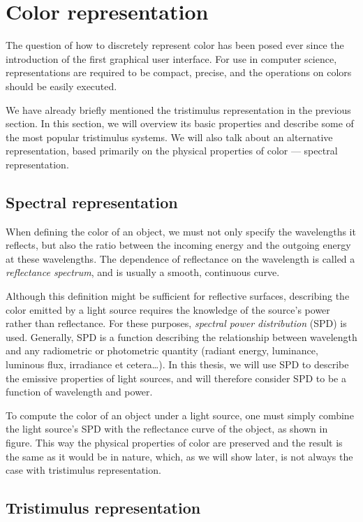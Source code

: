 \section{Color representation}

The question of how to discretely represent color has been posed ever since the introduction of the first graphical user interface. For use in computer science, representations are required to be compact, precise, and the operations on colors should be easily executed.

We have already briefly mentioned the tristimulus representation in the previous section. In this section, we will overview its basic properties and describe some of the most popular tristimulus systems. We will also talk about an alternative representation, based primarily on the physical properties of color --- spectral representation.

\subsection{Spectral representation}

When defining the color of an object, we must not only specify the wavelengths it reflects, but also the ratio between the incoming energy and the outgoing energy at these wavelengths. The dependence of reflectance on the wavelength is called a \emph{reflectance spectrum}, and is usually a smooth, continuous curve.

Although this definition might be sufficient for reflective surfaces, describing the color emitted by a light source requires the knowledge of the source's power rather than reflectance. For these purposes, \emph{spectral power distribution} (SPD) is used. Generally, SPD is a function describing the relationship between wavelength and any radiometric or photometric quantity (radiant energy, luminance, luminous flux, irradiance et cetera\ldots). In this thesis, we will use SPD to describe the emissive properties of light sources, and will therefore consider SPD to be a function of wavelength and power.

To compute the color of an object under a light source, one must simply combine the light source's SPD with the reflectance curve of the object, as shown in figure. This way the physical properties of color are preserved and the result is the same as it would be in nature, which, as we will show later, is not always the case with tristimulus representation.

\subsection{Tristimulus representation} \label{ssec:tristimulusRepres}


